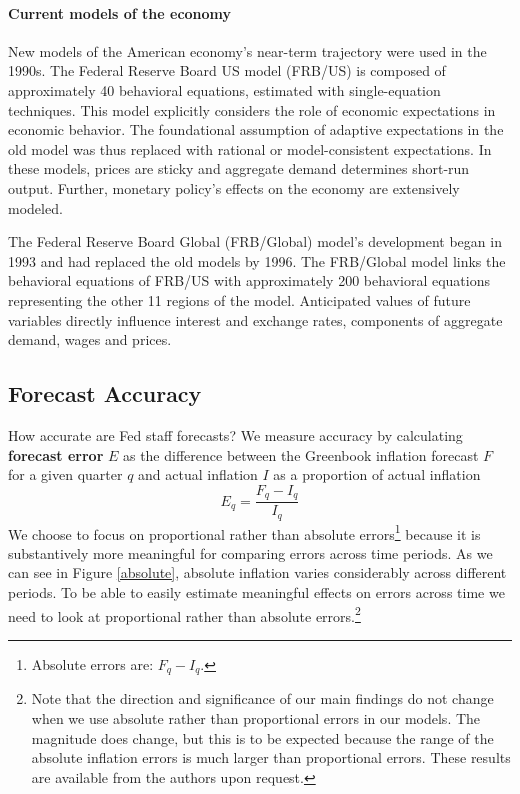 \documentclass[a4paper]{article}\usepackage{graphicx, color}
\begin{document}
\paragraph{Current models of the economy}
New models of the American economy's near-term trajectory were used in the 1990s. The Federal Reserve Board US model (FRB/US) is composed of approximately 40 behavioral equations, estimated with single-equation techniques. This model explicitly considers the role of economic expectations in economic behavior. The foundational assumption of adaptive expectations in the old model was thus replaced with rational or model-consistent expectations. In these models, prices are sticky and aggregate demand determines short-run output. Further, monetary policy's effects on the economy are extensively modeled. 

The Federal Reserve Board Global (FRB/Global) model's development began in 1993 and had replaced the old models by 1996. The FRB/Global model links the behavioral equations of FRB/US with approximately 200 behavioral equations representing the other 11 regions of the model. Anticipated values of future variables directly influence interest and exchange rates, components of aggregate demand, wages and prices.

\subsection{Forecast Accuracy}\label{ForecastAcc}

How accurate are Fed staff forecasts? We measure accuracy by calculating {\bf{forecast error}} $E$ as the difference between the Greenbook inflation forecast $F$ for a given quarter $q$ and actual inflation $I$ as a proportion of actual inflation
%
\begin{equation}
    E_{q} = \frac{F_{q} - I_{q}}{I_{q}}
\end{equation}
%
We choose to focus on proportional rather than absolute errors\footnote{Absolute errors are: $F_{q} - I_{q}$.} because it is substantively more meaningful for comparing errors across time periods. As we can see in Figure \ref{absolute}, absolute inflation varies considerably across different periods. To be able to easily estimate meaningful effects on errors across time we need to look at proportional rather than absolute errors.\footnote{Note that the direction and significance of our main findings do not change when we use absolute rather than proportional errors in our models. The magnitude does change, but this is to be expected because the range of the absolute inflation errors is much larger than proportional errors. These results are available from the authors upon request.}
\end{document}
